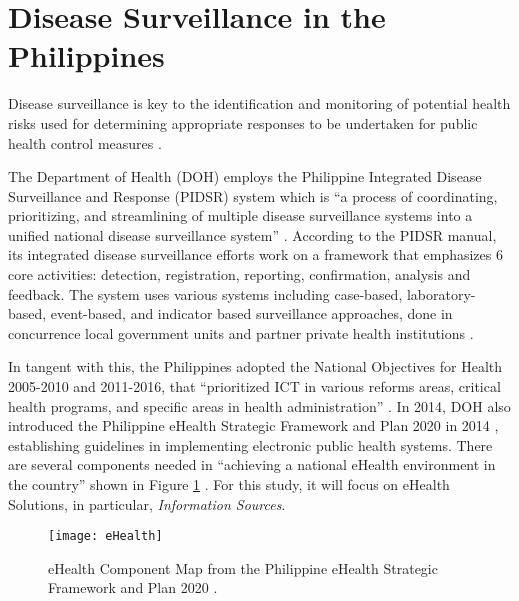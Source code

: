 \section{Disease Surveillance in the Philippines}


Disease surveillance is key to the identification and monitoring of potential health risks used for determining appropriate responses to be undertaken for public health control measures \cite{doh2014manual}.

The Department of Health (DOH) employs the Philippine Integrated Disease Surveillance and Response (PIDSR) system which is “a process of coordinating, prioritizing, and streamlining of multiple disease surveillance systems into a unified national disease surveillance system” \cite{doh2014manual}. According to the PIDSR manual, its integrated disease surveillance efforts work on a framework that emphasizes 6 core activities: detection, registration, reporting, confirmation, analysis and feedback. The system uses various systems including case-based, laboratory-based, event-based, and indicator based surveillance approaches, done in concurrence local government units and partner private health institutions \cite{doh2014manual}.

In tangent with this, the Philippines adopted the National Objectives for Health 2005-2010 and 2011-2016, that ``prioritized ICT in various reforms areas, critical health programs, and specific areas in health administration'' \cite{doh2014ehealth}. In 2014, DOH also introduced the Philippine eHealth Strategic Framework and Plan 2020 in 2014 \cite{doh2014ehealth}, establishing guidelines in implementing electronic public health systems. There are several components needed in ``achieving a national eHealth environment in the country'' shown in Figure \ref{fig:eHealth} \cite{doh2014ehealth}. For this study, it will focus on eHealth Solutions, in particular, \textit{Information Sources}. 

\begin{figure}[H]
    \centering
    \texttt{[image: eHealth]}
	\caption{eHealth Component Map from the Philippine eHealth Strategic Framework and Plan 2020 \cite{doh2014ehealth}.}
	\label{fig:eHealth}
\end{figure}